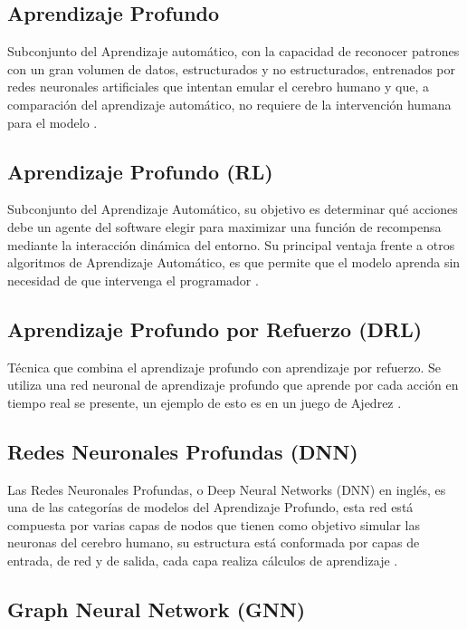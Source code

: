 \subsection{Aprendizaje Profundo}

Subconjunto del Aprendizaje automático, con la capacidad de reconocer patrones con un gran volumen de datos, estructurados y no estructurados, entrenados por redes neuronales artificiales que intentan emular el cerebro humano y que, a comparación del aprendizaje automático, no requiere de la intervención humana para el modelo \parencite{gl_IBMIA}.

\subsection{Aprendizaje Profundo (RL)}
Subconjunto del Aprendizaje Automático, su objetivo es determinar qué acciones debe un agente del software elegir para maximizar una función de recompensa mediante la interacción dinámica del entorno. Su principal ventaja frente a otros algoritmos de Aprendizaje Automático, es que permite que el modelo aprenda sin necesidad de que intervenga el programador \parencite{gl_techopedia}.

\subsection{Aprendizaje Profundo por Refuerzo (DRL)}

Técnica que combina el aprendizaje profundo con aprendizaje por refuerzo. Se utiliza una red neuronal de aprendizaje profundo que aprende por cada acción en tiempo real se presente, un ejemplo de esto es en un juego de Ajedrez \parencite{gl_Gamco}.

\subsection{Redes Neuronales Profundas (DNN)}

Las Redes Neuronales Profundas, o Deep Neural Networks (DNN) en inglés, es una de las categorías de modelos del Aprendizaje Profundo, esta red está compuesta por varias capas de nodos que tienen como objetivo simular las neuronas del cerebro humano, su estructura está conformada por capas de entrada, de red y de salida, cada capa realiza cálculos de aprendizaje \parencite{pr_talaei}. 

\subsection{Graph Neural Network (GNN)}


